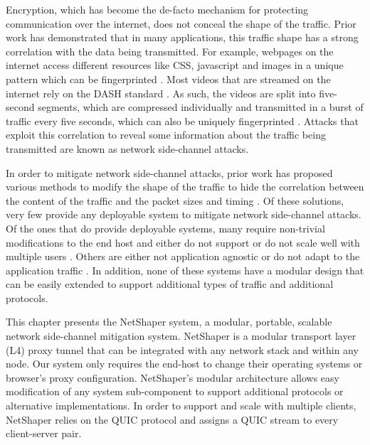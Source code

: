 
Encryption, which has become the de-facto mechanism for protecting communication over the internet, does not conceal the shape of the traffic.
Prior work has demonstrated that in many applications, this traffic shape has a strong correlation with the data being transmitted.
For example, webpages on the internet access different resources like CSS, javascript and images in a unique pattern which can be fingerprinted \cite{gong2010fingerprinting, bhat2019varcnn, wang2014supersequence}.
Most videos that are streamed on the internet rely on the DASH standard \cite{dash2013}.
As such, the videos are split into five-second segments, which are compressed individually and transmitted in a burst of traffic every five seconds, which can also be uniquely fingerprinted \cite{schuster2017beautyburst}.
Attacks that exploit this correlation to reveal some information about the traffic being transmitted are known as network side-channel attacks.


In order to mitigate network side-channel attacks, prior work has proposed various methods to modify the shape of the traffic to hide the correlation between the content of the traffic and the packet sizes and timing \cite{hou2020wf, nasr2021blind, rahman2020mockingbird, shan2021dolos, wang2017walkie, wright2009traffic, mehta2022pacer, zhang2019statistical, cai2014csbuflo, cherubin2017llama, luo2011httpos, smith2022qcsd, abusnaina2020dfd, cai2014tamaraw, gong2022surakav, juarez2016wtfpad, wang2014supersequence, wright2009morphing, barradas2017deltashaper}.
Of these solutions, very few provide any deployable system to mitigate network side-channel attacks.
Of the ones that do provide deployable systems, many require non-trivial modifications to the end host and either do not support or do not scale well with multiple users \cite{cai2014csbuflo, cherubin2017llama, luo2011httpos, smith2022qcsd, wang2017walkie, mehta2022pacer}.
Others are either not application agnostic or do not adapt to the application traffic \cite{barradas2017deltashaper, cherubin2017llama, luo2011httpos}.
In addition, none of these systems have a modular design that can be easily extended to support additional types of traffic and additional protocols.

This chapter presents the NetShaper system, a modular, portable, scalable network side-channel mitigation system.
NetShaper is a modular transport layer (L4) proxy tunnel that can be integrated with any network stack and within any node.
Our system only requires the end-host to change their operating systems or browser's proxy configuration.
NetShaper's modular architecture allows easy modification of any system sub-component to support additional protocols or alternative implementations.
In order to support and scale with multiple clients, NetShaper relies on the QUIC protocol and assigns a QUIC stream to every client-server pair.

